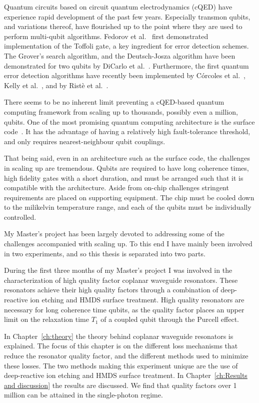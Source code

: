 \documentclass[12pt]{report}
\begin{document}
  Quantum circuits based on circuit quantum electrodynamics (cQED) have experience rapid development of the past few years. Especially transmon qubits, and variations thereof, have flourished up to the point where they are used to perform multi-qubit algorithms. Fedorov et al.~\cite{fedorov2011implementation} first demonstrated implementation of the Toffoli gate, a key ingredient for error detection schemes. The Grover's search algorithm, and the Deutsch-Josza algorithm have been demonstrated for two qubits by DiCarlo et al.~\cite{dicarlo2009demonstration}. Furthermore, the first quantum error detection algorithms have recently been implemented by C\'orcoles et al.~\cite{corcoles2015demonstration}, Kelly et al.~\cite{kelly2015state}, and by Rist\`e et al.~\cite{riste2014detecting}.

  There seems to be no inherent limit preventing a cQED-based quantum computing framework from scaling up to thousands, possibly even a million, qubits. One of the most promising quantum computing architecture is the surface code~\cite{bravyi1998quantum}. It has the advantage of having a relatively high fault-tolerance threshold, and only requires nearest-neighbour qubit couplings.

  That being said, even in an architecture such as the surface code, the challenges in scaling up are tremendous. Qubits are required to have long coherence times, high fidelity gates with a short duration, and must be arranged such that it is compatible with the architecture. Aside from on-chip challenges stringent requirements are placed on supporting equipment. The chip must be cooled down to the milikelvin temperature range, and each of the qubits must be individually controlled.

  My Master's project has been largely devoted to addressing some of the challenges accompanied with scaling up. To this end I have mainly been involved in two experiments, and so this thesis is separated into two parts.

  During the first three months of my Master's project I was involved in the characterization of high quality factor coplanar waveguide resonators. These resonators achieve their high quality factors through a combination of deep-reactive ion etching and HMDS surface treatment. High quality resonators are necessary for long coherence time qubits, as the quality factor places an upper limit on the relaxation time $T_1$ of a coupled qubit through the Purcell effect.

  In Chapter~\ref{ch:theory} the theory behind coplanar waveguide resonators is explained. The focus of this chapter is on the different loss mechanisms that reduce the resonator quality factor, and the different methods used to minimize these losses. The two methods making this experiment unique are the use of deep-reactive ion etching and HMDS surface treatment. In Chapter~\ref{ch:Results and discussion} the results are discussed. We find that quality factors over 1 million can be attained in the single-photon regime.
\end{document}
